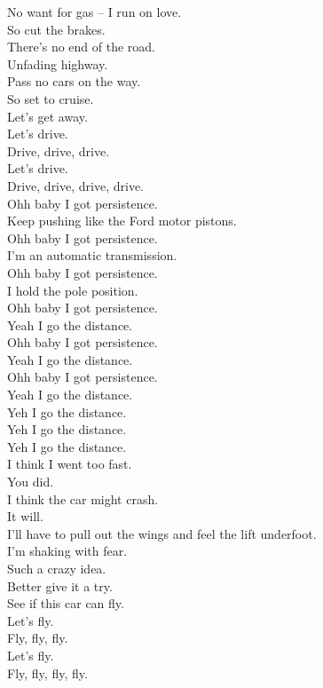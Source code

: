 No want for gas -- I run on love. \\
So cut the brakes. \\
There's no end of the road. \\
Unfading highway. \\
Pass no cars on the way. \\
So set to cruise. \\
Let's get away. \\

Let's drive. \\
Drive, drive, drive. \\
Let's drive. \\
Drive, drive, drive, drive. \\

Ohh baby I got persistence. \\
Keep pushing like the Ford motor pistons. \\
Ohh baby I got persistence. \\
I'm an automatic transmission. \\
Ohh baby I got persistence. \\
I hold the pole position. \\
Ohh baby I got persistence. \\
Yeah I go the distance. \\
Ohh baby I got persistence. \\
Yeah I go the distance. \\
Ohh baby I got persistence. \\
Yeah I go the distance. \\

Yeh I go the distance. \\
Yeh I go the distance. \\
Yeh I go the distance. \\

I think I went too fast. \\
You did. \\
I think the car might crash. \\
It will. \\
I'll have to pull out the wings and feel the lift underfoot. \\
I'm shaking with fear. \\
Such a crazy idea. \\
Better give it a try. \\
See if this car can fly. \\

Let's fly. \\
Fly, fly, fly. \\
Let's fly. \\
Fly, fly, fly, fly. \\

